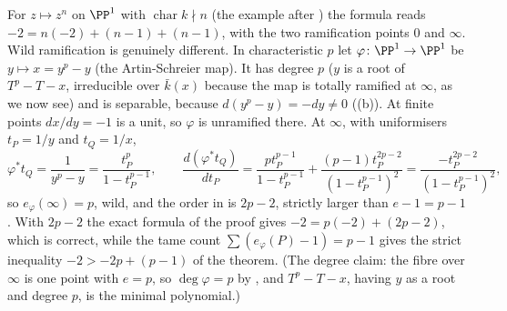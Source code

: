 For $z\mapsto z^n$ on $\PP^1$ with $\operatorname{char}k\nmid n$ (the example after ) the formula reads $-2=n(-2)+(n-1)+(n-1)$,
with the two ramification points $0$ and $\infty$. Wild ramification is genuinely different. In characteristic $p$ let $\varphi\colon\PP^1\to\PP^1$ be
$y\mapsto x=y^p-y$ (the Artin-Schreier map). It has degree $p$ ($y$ is a root of $T^p-T-x$, irreducible over $\bar k(x)$ because the map is totally ramified at
$\infty$, as we now see) and is separable, because $d(y^p-y)=-dy\ne0$ ((b)). At finite points $dx/dy=-1$ is a unit, so
$\varphi$ is unramified there. At $\infty$, with uniformisers $t_P=1/y$ and $t_Q=1/x$,
\[
\varphi^*t_Q=\frac1{y^p-y}=\frac{t_P^p}{1-t_P^{p-1}},\qquad\frac{d(\varphi^*t_Q)}{dt_P}=\frac{pt_P^{p-1}}{1-t_P^{p-1}}+\frac{(p-1)t_P^{2p-2}}{(1-t_P^{p-1})^2}=\frac{-t_P^{2p-2}}{(1-t_P^{p-1})^2},
\]
so $e_\varphi(\infty)=p$, wild, and the order in  is $2p-2$, strictly larger than $e-1=p-1$. With $2p-2$ the exact formula
of the proof gives $-2=p(-2)+(2p-2)$, which is correct, while the tame count $\sum(e_\varphi(P)-1)=p-1$ gives the strict inequality $-2>-2p+(p-1)$ of the theorem.
(The degree claim: the fibre over $\infty$ is one point with $e=p$, so $\deg\varphi=p$ by , and $T^p-T-x$, having $y$ as a root and
degree $p$, is the minimal polynomial.)


